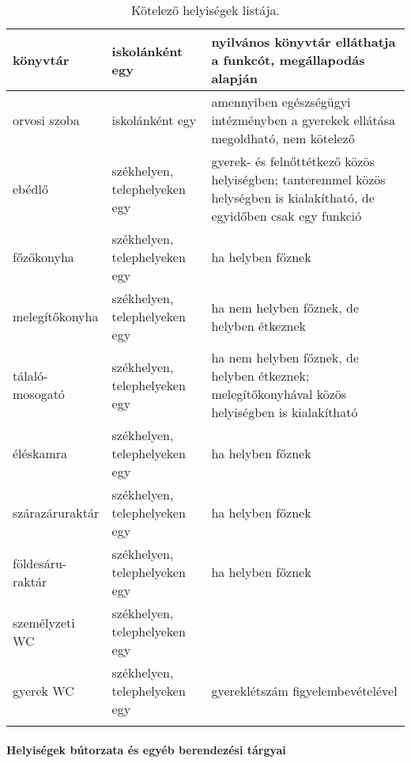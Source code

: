 \begin{spacing}{.99}
\begin{longtable}{@{}p{}|p{}|p{}@{}}
    \\ \hline
    könyvtár                      & iskolánként egy                     &
    nyilvános
    könyvtár elláthatja a funkcót, megállapodás alapján
    \\ \hline
    orvosi szoba                  & iskolánként egy                     &
    amennyiben
    egészségügyi intézményben a gyerekek ellátása megoldható, nem kötelező
    \\
    \hline
    ebédlő                        & székhelyen, telephelyeken egy       &
    gyerek- és
    felnőttétkező közös helyiségben; tanteremmel közös helységben is kialakítható, de egyidőben csak egy funkció
    \\ \hline
    főzőkonyha                    & székhelyen, telephelyeken egy       &
    ha helyben
    főznek
    \\ \hline
    melegítőkonyha                & székhelyen, telephelyeken egy       &
    ha nem
    helyben főznek, de helyben étkeznek
    \\ \hline
    tálaló-mosogató               & székhelyen, telephelyeken egy       &
    ha nem
    helyben főznek, de helyben étkeznek; melegítőkonyhával közös helyiségben
    is
    kialakítható
    \\ \hline
    éléskamra                     & székhelyen, telephelyeken egy       &
    ha helyben
    főznek
    \\ \hline
    szárazáruraktár               & székhelyen, telephelyeken egy       &
    ha helyben
    főznek
    \\ \hline
    földesáru-raktár              & székhelyen, telephelyeken egy       &
    ha helyben
    főznek
    \\ \hline
    személyzeti WC                & székhelyen, telephelyeken egy       &

    \\ \hline
    gyerek WC                     & székhelyen, telephelyeken egy       &
    gyereklétszám figyelembevételével
    \\

    \caption{Kötelező helyiségek listája.}
    \label{tbl:helyisegek}

\end{longtable}
\end{spacing}
\newpage

\paragraph{Helyiségek bútorzata és egyéb berendezési tárgyai}

